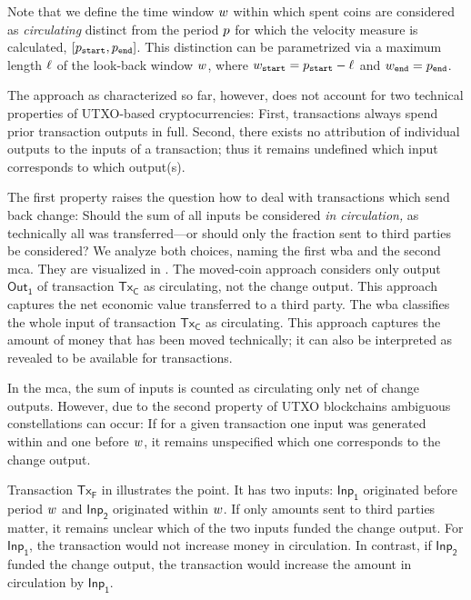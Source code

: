 Note that we define the time window ${w}$ within which spent coins are
considered as \emph{circulating} distinct from the period ${p}$ for which
the velocity measure is calculated, $ [{p}_{\mathtt{start}}, {p}_{{\mathtt{end}}}]$.  This
distinction can be parametrized via a maximum length ${\ell}$ of the
look-back window ${w}$, where ${w}_{\mathtt{start}} = {p}_{\mathtt{start}} - {\ell}$
and ${w}_{\mathtt{end}} = {p}_{\mathtt{end}}$.  %

The approach as characterized so far, however, does not account for two
technical properties of UTXO-based cryptocurrencies: %
First, transactions always spend prior transaction outputs in full.  %
Second, there exists no attribution of individual outputs to the inputs of a
transaction; thus it remains undefined which input corresponds to which
output(s).  %

The first property raises the question how to deal with transactions which
send back change: %
Should the sum of all inputs be considered \textit{in circulation,} as
technically all was transferred---or should only the fraction sent to third
parties be considered?  %
We analyze both choices, naming the first \ac{wba} and the second
\ac{mca}.  %
They are visualized in .  %
The moved-coin approach considers only output $\mathsf{Out_1}$ of transaction
$\mathsf{Tx_C}$ as circulating, not the change output.  %
This approach captures the net economic value transferred to a third
party.  %
The \ac{wba} classifies the whole input of transaction $\mathsf{Tx_C}$ as
circulating.  %
This approach captures the amount of money that has been moved technically;
it can also be interpreted as revealed to be available for transactions.  %

In the \ac{mca}, the sum of inputs is counted as circulating only net of
change outputs.  %
However, due to the second property of UTXO blockchains ambiguous
constellations can occur: If for a given transaction one input was generated
within and one before ${w}$, it remains unspecified which one corresponds
to the change output.  %

Transaction $\mathsf{Tx_F}$ in  illustrates the
point.  %
It has two inputs: $\mathsf{Inp_1}$ originated before period ${w}$ and
$\mathsf{Inp_2}$ originated within ${w}$.  %
If only amounts sent to third parties matter, it remains unclear which of the
two inputs funded the change output.  %
For $\mathsf{Inp_1}$, the transaction would not increase money in
circulation.  %
In contrast, if $\mathsf{Inp_2}$ funded the change output, the transaction
would increase the amount in circulation by $\mathsf{Inp_1}$. %

